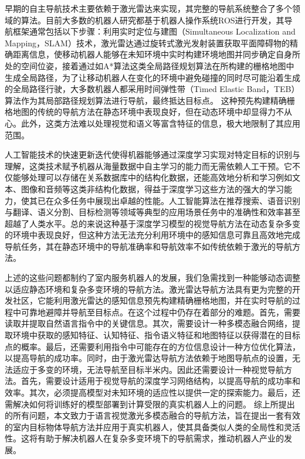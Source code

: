 	
	早期的自主导航技术主要依赖于激光雷达来实现，其完整的导航系统整合了多个领域的算法。目前大多数的机器人研究都基于机器人操作系统ROS\cite{ROS2018}进行开发，其导航框架通常包括以下步骤：利用实时定位与建图（Simultaneous Localization and Mapping，SLAM）\cite{dellaert1999monte, thrun2001robust}技术，激光雷达通过旋转式激光发射装置获取平面障碍物的精确距离信息，使移动机器人能够在未知环境中实时构建环境地图并同步确定自身所处的空间位姿，接着通过如A*算法\cite{hart1968formal}这类全局路径规划算法在所构建的栅格地图中生成全局路径，为了让移动机器人在变化的环境中避免碰撞的同时尽可能沿着生成的全局路径行驶，大多数机器人都采用时间弹性带（Timed Elastic Band，TEB）算法\cite{rosmann2013efficient}作为其局部路径规划算法进行导航，最终抵达目标点。
	这种预先构建精确栅格地图的传统的导航方法在静态环境中表现良好，但在动态环境中却显得力不从心。此外，这类方法难以处理视觉和语义等富含特征的信息，极大地限制了其应用范围。

	人工智能技术的快速更新迭代使得机器能够通过深度学习实现对特定目标的识别与理解，这类技术赋予机器从海量数据中自主学习的能力而无需依赖人工干预。它不仅能够处理可以存储在关系数据库中的结构化数据，还能高效地分析和学习例如文本、图像和音频等这类非结构化数据，得益于深度学习这些方法的强大的学习能力，使其已在众多任务中展现出卓越的性能。人工智能算法在推荐搜索、语音识别与翻译、语义分割、目标检测等领域等典型的应用场景任务中的准确性和效率甚至超越了人类水平。总的来说这种基于深度学习模型的视觉导航方法在动态复杂多变的环境中表现良好，但这种方法无法充分利用环境中的感知信息可靠且高效地完成导航任务，其在静态环境中的导航准确率和导航效率不如传统依赖于激光的导航方法。

	上述的这些问题都制约了室内服务机器人的发展，我们急需找到一种能够动态调整以适应静态环境和复杂多变环境的导航方法。激光雷达导航方法具有更为完整的开发社区，它能利用激光雷达的感知信息预先构建精确栅格地图，并在实时导航的过程中可靠地避障并导航至目标点。在这个过程中仍存在着部分的难题。首先，需要读取并提取自然语言指令中的关键信息。其次，需要设计一种多模态融合网络，提取环境中获取的感知特征、认知特征、指令语义特征和地图特征以获得潜在的目标点的概率。最后，还需要利用指令中可能存在的方位信息设计一种方位优化算法，以提高导航的成功率。同时，由于激光雷达导航方法依赖于地图导航点的设置，无法适应于多变的环境，无法导航至目标半米内。因此还需要设计一种视觉导航方法。首先，需要设计适用于视觉导航的深度学习网络结构，以提高导航的成功率和效率。其次，必须提高模型对未知环境的适应性以提供一定的探索能力。最后，还需解决如何将训练好的模型部署到计算受限的真实机器人上的问题。
	综上所提出的所有问题，本文致力于语言视觉激光多模态融合的导航方法，旨在提出一套有效的室内目标物体导航方法并应用于真实机器人，使其具备类似人类的全局性和灵活性。这将有助于解决机器人在复杂多变环境下的导航需求，推动机器人产业的发展。


